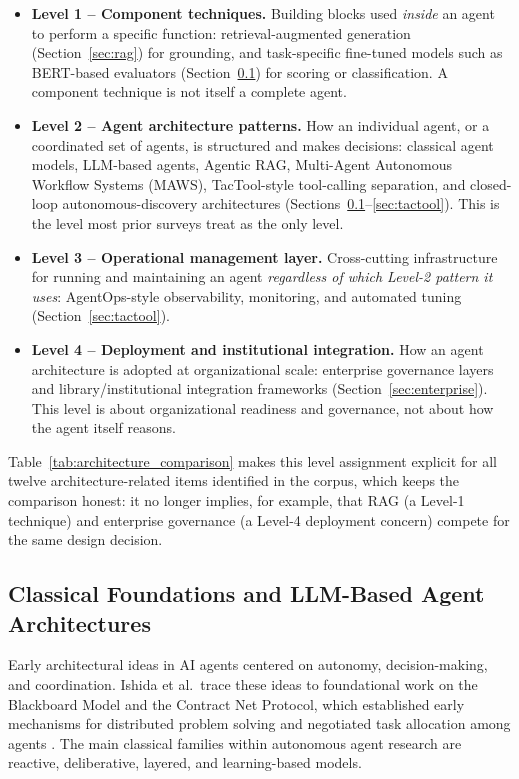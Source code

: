\documentclass[sn-basic,Numbered]{sn-jnl}
\begin{document}
\begin{itemize}
  \item \textbf{Level 1 -- Component techniques.} Building blocks used
  \emph{inside} an agent to perform a specific function: retrieval-augmented
  generation (Section~\ref{sec:rag}) for grounding, and
  task-specific fine-tuned models such as BERT-based evaluators
  (Section~\ref{sec:classicalllm}) for scoring or classification. A
  component technique is not itself a complete agent.
  \item \textbf{Level 2 -- Agent architecture patterns.} How an
  individual agent, or a coordinated set of agents, is structured and
  makes decisions: classical agent models, LLM-based agents, Agentic
  RAG, Multi-Agent Autonomous Workflow Systems (MAWS), TacTool-style
  tool-calling separation, and closed-loop autonomous-discovery
  architectures (Sections~\ref{sec:classicalllm}--\ref{sec:tactool}).
  This is the level most prior surveys treat as the only level.
  \item \textbf{Level 3 -- Operational management layer.} Cross-cutting
  infrastructure for running and maintaining an agent \emph{regardless
  of which Level-2 pattern it uses}: AgentOps-style observability,
  monitoring, and automated tuning (Section~\ref{sec:tactool}).
  \item \textbf{Level 4 -- Deployment and institutional integration.}
  How an agent architecture is adopted at organizational scale:
  enterprise governance layers and library/institutional integration
  frameworks (Section~\ref{sec:enterprise}). This level is about
  organizational readiness and governance, not about how the agent
  itself reasons.
\end{itemize}

Table~\ref{tab:architecture_comparison} makes this level assignment
explicit for all twelve architecture-related items identified in the
corpus, which keeps the comparison honest: it no longer implies, for
example, that RAG (a Level-1 technique) and enterprise governance (a
Level-4 deployment concern) compete for the same design decision.

\subsection{Classical Foundations and LLM-Based Agent Architectures}
\label{sec:classicalllm}

Early architectural ideas in AI agents centered on autonomy,
decision-making, and coordination. Ishida et al.\ trace these ideas to
foundational work on the Blackboard Model and the Contract Net
Protocol, which established early mechanisms for distributed problem
solving and negotiated task allocation among agents
\cite{ishida2025conceptcodecommerce}. The main classical families
within autonomous agent research are reactive, deliberative, layered,
and learning-based models.
\end{document}
